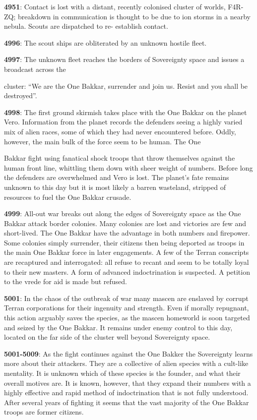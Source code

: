 \documentclass{scrbook}
\begin{document}
\textbf{4951}: Contact is lost with a distant, recently colonised cluster of worlds, F4R-ZQ; breakdown in communication is thought to be due to ion storms in a nearby nebula. Scouts are dispatched to re- establish contact.

\textbf{4996}: The scout ships are obliterated by an unknown hostile fleet.

\textbf{4997}: The unknown fleet reaches the borders of Sovereignty space and issues a broadcast across the

cluster: ``We are the One Bakkar, surrender and join us. Resist and you shall be destroyed''.

\textbf{4998}: The first ground skirmish takes place with the One Bakkar on the planet Vero. Information from the planet records the defenders seeing a highly varied mix of alien races, some of which they had never encountered before. Oddly, however, the main bulk of the force seem to be human. The One

Bakkar fight using fanatical shock troops that throw themselves against the human front line, whittling them down with sheer weight of numbers. Before long the defenders are overwhelmed and Vero is lost. The planet's fate remains unknown to this day but it is most likely a barren wasteland, stripped of resources to fuel the One Bakkar crusade.

\textbf{4999}: All-out war breaks out along the edges of Sovereignty space as the One Bakkar attack border colonies. Many colonies are lost and victories are few and short-lived. The One Bakkar have the advantage in both numbers and firepower. Some colonies simply surrender, their citizens then being deported as troops in the main One Bakkar force in later engagements. A few of the Terran conscripts are recaptured and interrogated: all refuse to recant and seem to be totally loyal to their new masters. A form of advanced indoctrination is suspected. A petition to the vrede for aid is made but refused.

\textbf{5001}: In the chaos of the outbreak of war many mascen are enslaved by corrupt Terran corporations for their ingenuity and strength. Even if morally repugnant, this action arguably saves the species, as the mascen homeworld is soon targeted and seized by the One Bakkar. It remains under enemy control to this day, located on the far side of the cluster well beyond Sovereignty space.

\textbf{5001-5009}: As the fight continues against the One Bakker the Sovereignty learns more about their attackers. They are a collective of alien species with a cult-like mentality. It is unknown which of these species is the founder, and what their overall motives are. It is known, however, that they expand their numbers with a highly effective and rapid method of indoctrination that is not fully understood. After several years of fighting it seems that the vast majority of the One Bakkar troops are former citizens.
\end{document}
